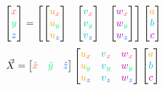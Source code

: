 \documentclass[preview]{standalone}
\begin{document}
$$\begin{bmatrix}\textcolor[HTML]{fe5e56}{x}\\\textcolor[HTML]{00ef75}{y}\\\textcolor[HTML]{0069fe}{z}\end{bmatrix} = \begin{bmatrix}
\begin{bmatrix}\textcolor[HTML]{efac00}{u}_{\textcolor[HTML]{fe5e56}{x}}\\\textcolor[HTML]{efac00}{u}_{\textcolor[HTML]{00ef75}{y}}\\\textcolor[HTML]{efac00}{u}_{\textcolor[HTML]{0069fe}{z}}\end{bmatrix} &
\begin{bmatrix}\textcolor[HTML]{00b4c4}{v}_{\textcolor[HTML]{fe5e56}{x}}\\\textcolor[HTML]{00b4c4}{v}_{\textcolor[HTML]{00ef75}{y}}\\\textcolor[HTML]{00b4c4}{v}_{\textcolor[HTML]{0069fe}{z}}\end{bmatrix} &
\begin{bmatrix}\textcolor[HTML]{ba00b2}{w}_{\textcolor[HTML]{fe5e56}{x}}\\\textcolor[HTML]{ba00b2}{w}_{\textcolor[HTML]{00ef75}{y}}\\\textcolor[HTML]{ba00b2}{w}_{\textcolor[HTML]{0069fe}{z}}\end{bmatrix}
\end{bmatrix}\begin{bmatrix}\textcolor[HTML]{efac00}{a}\\\textcolor[HTML]{00b4c4}{b}\\\textcolor[HTML]{ba00b2}{c}\end{bmatrix}$$
$$\vec{X} = \begin{bmatrix}\textcolor[HTML]{fe5e56}{\hat{x}}&\textcolor[HTML]{00ef75}{\hat{y}}&\textcolor[HTML]{0069fe}{\hat{z}}\end{bmatrix}\begin{bmatrix}
\textcolor[HTML]{efac00}{u}_{\textcolor[HTML]{fe5e56}{x}}&\textcolor[HTML]{00b4c4}{v}_{\textcolor[HTML]{fe5e56}{x}}&\textcolor[HTML]{ba00b2}{w}_{\textcolor[HTML]{fe5e56}{x}}\\
\textcolor[HTML]{efac00}{u}_{\textcolor[HTML]{00ef75}{y}}&\textcolor[HTML]{00b4c4}{v}_{\textcolor[HTML]{00ef75}{y}}&\textcolor[HTML]{ba00b2}{w}_{\textcolor[HTML]{00ef75}{y}}\\
\textcolor[HTML]{efac00}{u}_{\textcolor[HTML]{0069fe}{z}}&\textcolor[HTML]{00b4c4}{v}_{\textcolor[HTML]{0069fe}{z}}&\textcolor[HTML]{ba00b2}{w}_{\textcolor[HTML]{0069fe}{z}}
\end{bmatrix}\begin{bmatrix}\textcolor[HTML]{efac00}{a}\\\textcolor[HTML]{00b4c4}{b}\\\textcolor[HTML]{ba00b2}{c}\end{bmatrix}$$
\end{document}

